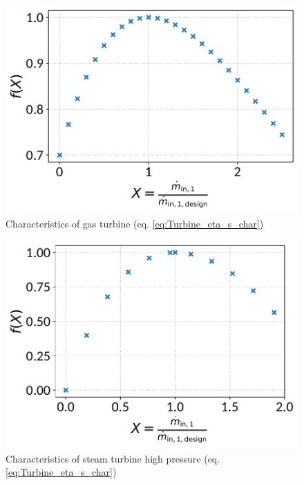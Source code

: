 \documentclass[]{article}
\begin{document}
\begin{minipage}{0.5\textwidth}
\begin{figure}[H]\begin{center}
\includegraphics[width=\textwidth]{figures/Turbine_CharLine_eta_s_char_gas_turbine.pdf}
\caption{Characteristics of gas turbine (eq. \ref{eq:Turbine_eta_s_char})}
\label{fig:CharLine_eta_s_char_gas turbine}
\end{center}\end{figure}

\end{minipage}
\begin{minipage}{0.5\textwidth}
\begin{figure}[H]\begin{center}
\includegraphics[width=\textwidth]{figures/Turbine_CharLine_eta_s_char_steam_turbine_high_pressure.pdf}
\caption{Characteristics of steam turbine high pressure (eq. \ref{eq:Turbine_eta_s_char})}
\label{fig:CharLine_eta_s_char_steam turbine high pressure}
\end{center}\end{figure}

\end{minipage}
\end{document}

